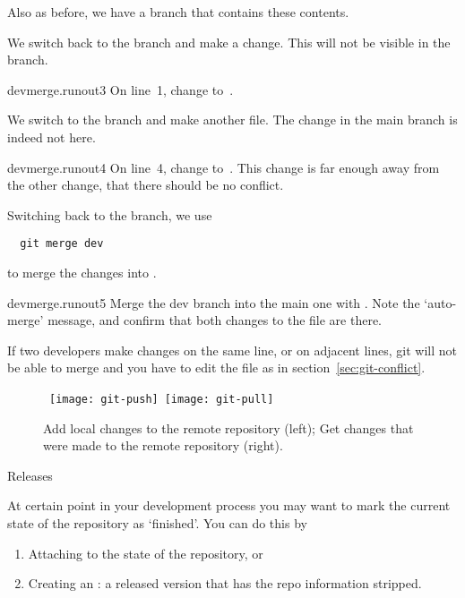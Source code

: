 Also as before, we have a  branch that contains
these contents.


We switch back to the  branch and make a change.
This will not be visible in the  branch.

\begin{gitstep}{devmerge.runout3}
  On line~1, change  to~.
\end{gitstep}

We switch to the  branch and make another file.
The change in the main branch is indeed not here.

\begin{gitstep}{devmerge.runout4}
  On line~4, change  to~.
  This change is far enough away from the other change,
  that there should be no conflict.
\end{gitstep}

Switching back to the  branch, we use
\begin{lstlisting}
  git merge dev
\end{lstlisting}
to merge the  changes into .

\begin{gitstep}{devmerge.runout5}
  Merge the dev branch into the main one with .
  Note the `auto-merge' message,
  and confirm that both changes to the file are there.
\end{gitstep}

If two developers make changes on the same line, or on adjacent lines,
git will not be able to merge
and you have to edit the file as in section~\ref{sec:git-conflict}.

\begin{figure}[ht]
  \hbox{
  \texttt{[image: git-push]}
  \texttt{[image: git-pull]}
  }
  \caption{Add local changes to the remote repository (left);
    Get changes that were made to the remote repository (right).}
  \label{fig:git-push}
  \label{fig:git-pull}
\end{figure}

 {Releases}

At certain point in your development process you
may want to mark the current state of the repository
as `finished'.
You can do this by 
\begin{enumerate}
\item Attaching  to the state of the repository, or
\item Creating an : a released version that
  has the repo information stripped.
\end{enumerate}

